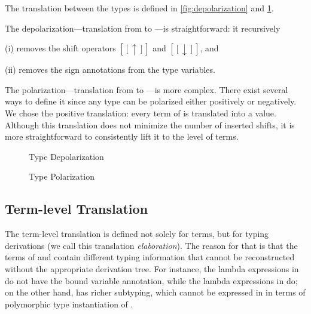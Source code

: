 \documentclass[acmsmall,natbib=false,review,anonymous]{acmart}
\begin{document}
The translation between the types is defined in 
\cref{fig:depolarization} and \cref{fig:polarization}.

The depolarization---translation from \fexists to \systemf---is
straightforward: it recursively
\begin{enumerate*}
  \item [(i)] removes the shift operators $[[↑]]$ and $[[↓]]$, and
  \item [(ii)] removes the sign annotations from the type variables.
\end{enumerate*}

The polarization---translation from \systemf to \fexists---is more complex.
There exist several ways to define it since any \systemf type can
be polarized either positively or negatively.
We chose the positive translation: every term of \systemf is translated
into a value. Although this translation does not minimize the number of
inserted shifts, it is more straightforward to consistently
lift it to the level of terms.

\begin{figure}[ht]
  \begin{minipage}[t]{0.65\linewidth}
    \centering
      \begin{minipage}[t]{0.32\linewidth}
      \ottfundefnunpolP{}
      \end{minipage}
      \begin{minipage}[t]{0.32\linewidth}
      \ottfundefnunpolN{}
      \end{minipage}
    \caption{Type Depolarization}
    \label{fig:depolarization}
  \end{minipage}
  \hspace{0.5cm}
  \begin{minipage}[t]{0.3\linewidth}
    \centering
    \ottfundefnpolarP{}
    \caption{Type Polarization}
    \label{fig:polarization}
  \end{minipage}
\end{figure}




\subsection{Term-level Translation}

The term-level translation is defined not solely for terms, but for typing
derivations (we call this translation \emph{elaboration}). 
The reason for that is that the terms of \systemf and \fexists
contain different typing information that cannot be reconstructed without the
appropriate derivation tree. For instance, the lambda expressions in \systemf do
not have the bound variable annotation, while the lambda expressions in \fexists
do; on the other hand, \fexists has richer subtyping, which cannot be expressed in
in terms of polymorphic type instantiation of \systemf.
\end{document}
